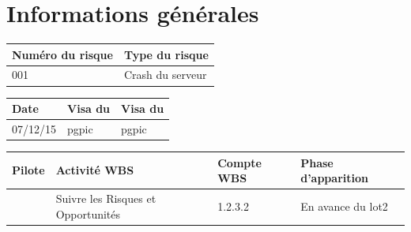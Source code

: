 \section*{Informations générales}

 

\begin{table}[H]

\centering

	\begin{tabularx}{16.8cm}{|X|X|}

	\hline

	\rowcolor{gray!40} Numéro du risque & Type du risque \\

	\hline

	001 & Crash du serveur \\

	\hline

	\end{tabularx}

\end{table}

\begin{table}[H]

\centering

	\begin{tabularx}{16.8cm}{|X|X|X|}

	\hline

	\rowcolor{gray!40} Date & Visa du \RQ & Visa du \CP \\

	\hline

	 07/12/15 & pgpic & pgpic \\

	\hline

	\end{tabularx}

\end{table}

\begin{table}[H]

\centering

	\begin{tabularx}{16.8cm}{|X|X|X|X|}

	\hline

	\rowcolor{gray!40} Pilote & Activité WBS & Compte WBS & Phase d'apparition \\

	\hline

	 \Matthieu & Suivre les Risques et Opportunités & 1.2.3.2 & En avance du lot2\\

	\hline

	\end{tabularx}

\end{table}


